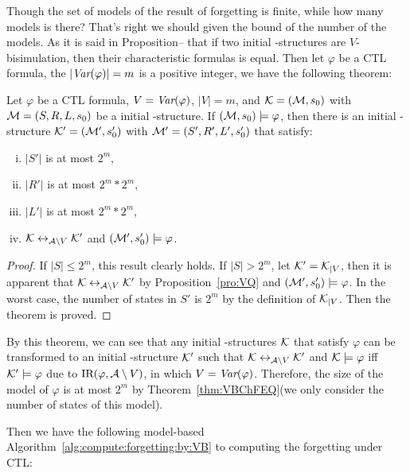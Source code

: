 \documentclass{article}
\begin{document}
Though the set of models of the result of forgetting is finite, while how many models is there?
That's right we should given the bound of the number of the models.
As it is said in Proposition-- that if two initial \MPK-structures are $V$-bisimulation, then their characteristic formulas is equal.
Then let $\varphi$ be a CTL formula, the $|\textit{Var}(\varphi)|=m$ is a positive integer, we have the following theorem:
\begin{theorem}
Let $\varphi$ be a CTL formula, $V=\textit{Var}(\varphi)$, $|V|=m$, and ${\cal K}=({\cal M}, s_0)$ with ${\cal M}=(S, R,L,s_0)$ be a initial \MPK-structure. If $({\cal M}, s_0) \models \varphi$, then there is an initial \MPK-structure ${\cal K}'=({\cal M}', s_0')$ with ${\cal M}'=(S', R',L',s_0')$ that satisfy:
\begin{enumerate}[(i)]
  \item $|S'|$ is at most $2^m$,
  \item $|R'|$ is at most $2^m * 2^m$,
  \item $|L'|$ is at most $2^m * 2^m$,
  \item ${\cal K} \leftrightarrow_{{\cal A} \setminus V} {\cal K}'$ and $({\cal M}', s_0') \models \varphi$.
\end{enumerate}
\end{theorem}
\begin{proof}
If $|S| \leq 2^m$, this result clearly holds. If $|S| > 2^m$, let ${\cal K}' = {\cal K}_{|V}$, then it is apparent that ${\cal K} \leftrightarrow_{{\cal A} \setminus V} {\cal K}'$ by Proposition~\ref{pro:VQ} and $({\cal M}', s_0') \models \varphi$. In the worst case, the number of states in $S'$ is $2^m$ by the definition of ${\cal K}_{|V}$. Then the theorem is proved.
\end{proof}

By this theorem, we can see that any initial \MPK-structures ${\cal K}$ that satisfy $\varphi$ can be transformed to an initial \MPK-structure ${\cal K}'$ such that ${\cal K} \leftrightarrow_{{\cal A} \setminus V} {\cal K}'$ and ${\cal K} \models \varphi$ iff ${\cal K}' \models \varphi$ due to $\textrm{IR}(\varphi, {\cal A}\setminus V)$, in which $V= \textit{Var}(\varphi)$. Therefore, the size of the model of $\varphi$ is at most $2^m$ by Theorem~\ref{thm:VBChFEQ}(we only consider the number of states of this model).

Then we have the following model-based Algorithm~\ref{alg:compute:forgetting:by:VB} to computing the forgetting under CTL:
\end{document}
